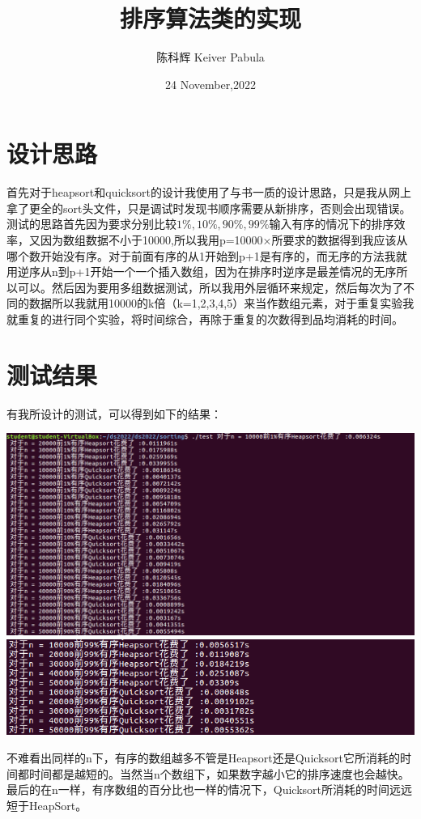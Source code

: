 \documentclass{ctexart}
\title{排序算法类的实现}
\author{陈科辉 Keiver Pabula}
\date{24 November,2022}
\begin{document}
\maketitle

\section{设计思路}
首先对于heapsort和quicksort的设计我使用了与书一质的设计思路，只是我从网上拿了更全的sort头文件，只是调试时发现书顺序需要从新排序，否则会出现错误。
测试的思路首先因为要求分别比较$1\%,10\%,90\%,99\%$输入有序的情况下的排序效率，又因为数组数据不小于10000,所以我用p=10000×所要求的数据得到我应该从哪个数开始没有序。对于前面有序的从1开始到p+1是有序的，而无序的方法我就用逆序从n到p+1开始一个一个插入数组，因为在排序时逆序是最差情况的无序所以可以。然后因为要用多组数据测试，所以我用外层循环来规定，然后每次为了不同的数据所以我就用10000的k倍（k=1,2,3,4,5）来当作数组元素，对于重复实验我就重复的进行同个实验，将时间综合，再除于重复的次数得到品均消耗的时间。
\section{测试结果}
有我所设计的测试，可以得到如下的结果：
\begin{center}
  \includegraphics[scale=0.5]{ss1.png}
  \hspace{0.1in}
  \includegraphics[scale=0.6]{ss2.png}
  \hspace{0.1in}
\end{center}
不难看出同样的n下，有序的数组越多不管是Heapsort还是Quicksort它所消耗的时间都时间都是越短的。当然当n个数组下，如果数字越小它的排序速度也会越快。最后的在n一样，有序数组的百分比也一样的情况下，Quicksort所消耗的时间远远短于HeapSort。
\end{document}
